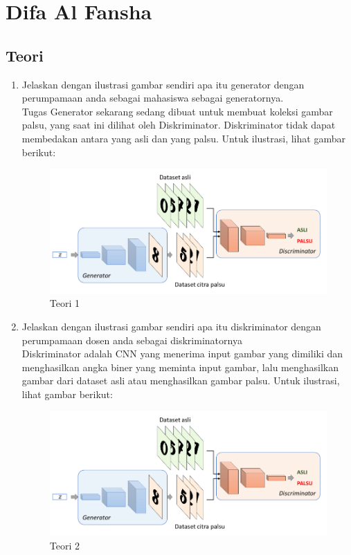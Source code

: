 \section{Difa Al Fansha}
\subsection{Teori}
\begin{enumerate}

	\item Jelaskan dengan ilustrasi gambar sendiri apa itu generator dengan perumpamaan anda sebagai mahasiswa sebagai generatornya.
	\hfill\\
Tugas Generator sekarang sedang dibuat untuk membuat koleksi gambar palsu, yang saat ini dilihat oleh Diskriminator. Diskriminator tidak dapat membedakan antara yang asli dan yang palsu. Untuk ilustrasi, lihat gambar berikut:

\begin{figure}[H]
    \includegraphics[width=12cm]{figures/1174076/figures8/teori1.png}
    \centering
    \caption{Teori 1}
\end{figure}

\item Jelaskan dengan ilustrasi gambar sendiri apa itu diskriminator dengan perumpamaan dosen anda sebagai diskriminatornya
	\hfill\\
	Diskriminator adalah CNN yang menerima input gambar yang dimiliki dan menghasilkan angka biner yang meminta input gambar, lalu menghasilkan gambar dari dataset asli atau menghasilkan gambar palsu. Untuk ilustrasi, lihat gambar berikut:  

\begin{figure}[H]
    \includegraphics[width=12cm]{figures/1174076/figures8/teori1.png}
    \centering
    \caption{Teori 2}
\end{figure}


\end{enumerate}
